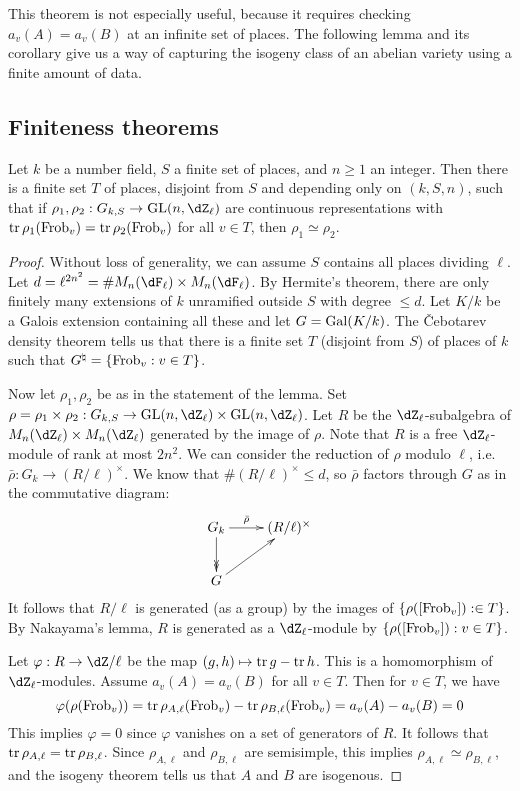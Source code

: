 This theorem is not especially useful, because it requires checking 
$a_v(A)=a_v(B)$ at an infinite set of places. The following lemma and its 
corollary give us a way of capturing the isogeny class of an abelian variety 
using a finite amount of data. 





\subsection{Finiteness theorems}

\begin{lemma}[Faltings]
Let $k$ be a number field, $S$ a finite set of places, and $n\geqslant 1$ an 
integer. Then there is a finite set $T$ of places, disjoint from $S$ and 
depending only on $(k,S,n)$, such that if 
$\rho_1,\rho_2:G_{k,S} \to \gl{n}{\dZ_\ell}$ are continuous representations 
with $\operatorname{tr}\rho_1(\mathrm{Frob}_v) = \operatorname{tr} \rho_2(\mathrm{Frob}_v)$ for all $v\in T$, then 
$\rho_1\simeq \rho_2$. 
\end{lemma}
\begin{proof}
Without loss of generality, we can assume $S$ contains all places dividing 
$\ell$. Let $d = \ell^{2 n^2} = \# M_n(\dF_\ell)\times M_n(\dF_\ell)$. By 
Hermite's theorem, there are only finitely many extensions of $k$ unramified 
outside $S$ with degree $\leqslant d$. Let $K/k$ be a Galois extension 
containing all these and let $G=\operatorname{Gal}(K/k)$. The \v Cebotarev density theorem 
tells us that there is a finite set $T$ (disjoint from $S$) of places of $k$ 
such that $G^\natural = \{\mathrm{Frob}_v:v\in T\}$. 

Now let $\rho_1,\rho_2$ be as in the statement of the lemma. Set 
$\rho=\rho_1\times\rho_2:G_{k,S} \to \gl{n}{\dZ_\ell}\times \gl{n}{\dZ_\ell}$. 
Let $R$ be the $\dZ_\ell$-subalgebra of 
$M_n(\dZ_\ell)\times M_n(\dZ_\ell)$ generated by the image of $\rho$. Note that 
$R$ is a free $\dZ_\ell$-module of rank at most $2 n^2$. We can consider the 
reduction of $\rho$ modulo $\ell$, i.e. $\bar\rho:G_k \to (R/\ell)^\times$. We 
know that $\# (R/\ell)^\times \leqslant d$, so $\bar\rho$ factors through $G$ 
as in the commutative diagram: 
\[\xymatrix{
  G_k \ar[r]^-{\bar\rho} \ar@{->>}[d] 
    & (R/\ell)^\times \\
  G \ar[ur]
}\]
It follows that $R/\ell$ is generated (as a group) by the images of 
$\{\rho([\mathrm{Frob}_v]):\in T\}$. By Nakayama's lemma, $R$ is generated as a 
$\dZ_\ell$-module by $\{\rho([\mathrm{Frob}_v]):v\in T\}$. 

Let $\varphi:R \to \dZ/\ell$ be the map $(g,h)\mapsto \operatorname{tr} g-\operatorname{tr} h$. This 
is a homomorphism of $\dZ_\ell$-modules. Assume $a_v(A)=a_v(B)$ for all 
$v\in T$. Then for $v\in T$, we have 
\[
  \varphi(\rho(\mathrm{Frob}_v)) = \operatorname{tr} \rho_{A,\ell}(\mathrm{Frob}_v) - \operatorname{tr}\rho_{B,\ell}(\mathrm{Frob}_v) = a_v(A)-a_v(B) = 0 
\]
This implies $\varphi=0$ since $\varphi$ vanishes on a set of generators of 
$R$. It follows that $\operatorname{tr} \rho_{A,\ell} = \operatorname{tr}\rho_{B,\ell}$. Since 
$\rho_{A,\ell}$ and $\rho_{B,\ell}$ are semisimple, this implies 
$\rho_{A,\ell}\simeq \rho_{B,\ell}$, and the isogeny theorem tells us that 
$A$ and $B$ are isogenous. 
\end{proof}

